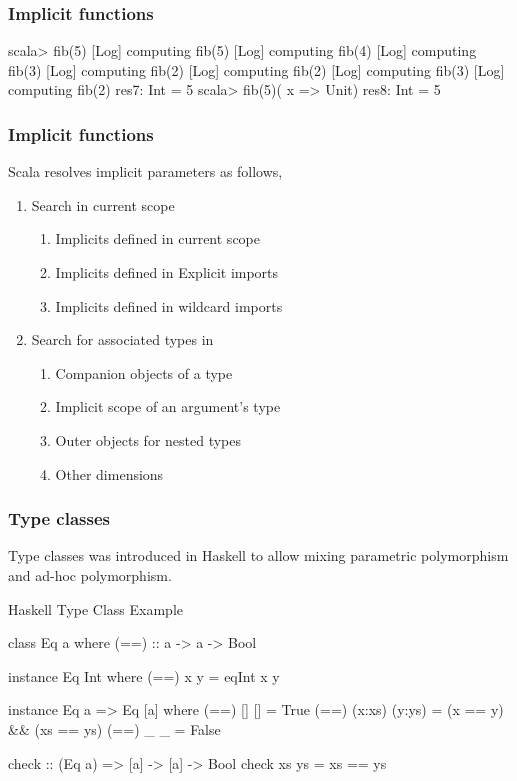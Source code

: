 \documentclass{beamer}
\newcommand{\beb}{\begin{exampleblock}}
\newcommand{\eeb}{\end{exampleblock}}
\begin{document}
\begin{frame}[fragile]
\frametitle{Implicit functions}

\begin{code}
scala> fib(5)
[Log] computing fib(5)
[Log] computing fib(4)
[Log] computing fib(3)
[Log] computing fib(2)
[Log] computing fib(2)
[Log] computing fib(3)
[Log] computing fib(2)
res7: Int = 5
scala> fib(5)( x => Unit) 
res8: Int = 5
\end{code}
\end{frame}
\begin{frame}[fragile]
\frametitle{Implicit functions}
Scala resolves implicit parameters as follows,
\begin{enumerate}
\item Search in current scope
  \begin{enumerate}
  \item Implicits defined in current scope
  \item Implicits defined in Explicit imports
  \item Implicits defined in wildcard imports
  \end{enumerate}
\item Search for associated types in
  \begin{enumerate}
  \item Companion objects of a type
  \item Implicit scope of an argument's type 
  \item Outer objects for nested types
  \item Other dimensions
  \end{enumerate}
\end{enumerate}
\end{frame}
\begin{frame}[fragile]
\frametitle{Type classes}

Type classes was introduced in Haskell to allow mixing parametric
polymorphism and ad-hoc polymorphism.
\beb{Haskell Type Class Example}
\begin{code}
class Eq a where 
  (==) :: a -> a -> Bool

instance Eq Int where
  (==) x y = eqInt x y

instance Eq a => Eq [a] where
  (==) [] [] = True
  (==) (x:xs) (y:ys) = (x == y) && (xs == ys)
  (==) _ _ = False

check :: (Eq a) => [a] -> [a] -> Bool
check xs ys = xs == ys
\end{code}
\eeb{}

\end{frame}
\end{document}

